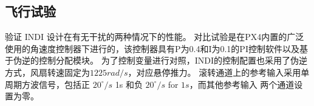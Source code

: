 \begin{ubox}
\section{飞行试验}


验证 INDI 设计在有无干扰的两种情况下的性能。 对比试验是在PX4内置的广泛使用的角速度控制器下进行的，该控制器具有P为0.4和I为0.1的PI控制软件以及基于伪逆的控制分配模块。 为了控制变量进行对照，INDI的控制配置也采用了伪逆方式，风扇转速固定为$1225rad/s$，对应悬停推力。 滚转通道上的参考输入采用单周期方波信号，包括正 $20^\circ/s$ 1s 和负 $20^\circ/s$ for $1s$，而其他参考输入 两个通道设置为零。 

\begin{figure}[H]
	\centering
	\quad   %
	\setcounter{subfigure}{3}
	\\
	\setcounter{subfigure}{1}
\end{figure}
\end{ubox}
